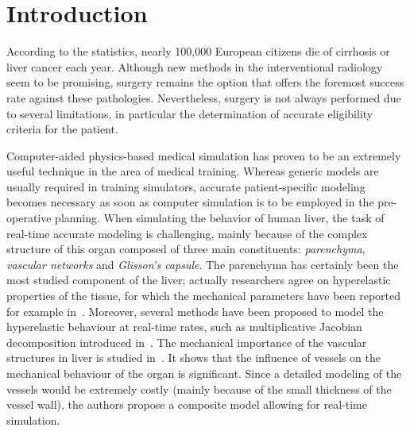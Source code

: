\section*{Introduction}%
According to the statistics, nearly 100,000 European citizens die of cirrhosis or liver cancer each year. 
Although new methods 
in the interventional radiology 
seem to be promising, surgery remains the option that offers the foremost success rate against these pathologies. 
Nevertheless, surgery is not always performed due to several limitations, in particular the determination 
of accurate eligibility criteria for the patient. 

Computer-aided physics-based medical simulation has proven to be an extremely useful technique in the area of medical training. 
Whereas generic models are usually required in training simulators, accurate patient-specific modeling
becomes necessary as soon as computer simulation is to be employed in the pre-operative planning. 
When simulating the behavior of human liver, the task of real-time accurate modeling is challenging, mainly because of the complex structure 
of this organ composed of three main constituents: \emph{parenchyma}, \emph{vascular networks} and \emph{Glisson's capsule}.
The parenchyma has certainly been the most studied component of the liver; actually researchers agree on hyperelastic 
properties of the tissue, for which the mechanical parameters have been reported for example in~\cite{Kerdok2006}.%
Moreover, several methods have been proposed to model the hyperelastic behaviour at real-time rates, such as multiplicative Jacobian decomposition
introduced in~\cite{Marchesseau2010}.
%
The mechanical importance of the vascular structures in liver is studied in~\cite{Peterlik2012}. It shows that the 
influence of vessels on the mechanical behaviour of the organ is significant. %
Since a detailed modeling of the vessels would be extremely costly (mainly because of the small thickness of the vessel wall), 
the authors propose a composite model allowing for real-time simulation.

